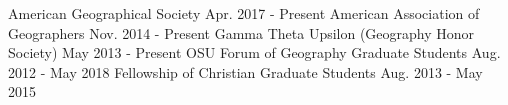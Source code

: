 \begin{cvmemberships}
  \cvmembership
    {\hspace{-3 em}}
    {American Geographical Society}
    {\hspace{-2 em} Apr. 2017 - Present}
    {} %
  \cvmembership
    {\hspace{-3 em}}
    {American Association of Geographers}
    {Nov. 2014 - Present}
    {} %
  \cvmembership
    {\hspace{-3 em}}
    {Gamma Theta Upsilon (Geography Honor Society)}
    {May 2013 - Present}
    {} %
  \cvmembership
    {\hspace{-3 em}}
    {OSU Forum of Geography Graduate Students}
    {Aug. 2012 - May 2018}
    {} %
  \cvmembership
    {\hspace{-3 em}}
    {Fellowship of Christian Graduate Students}
    {\hspace{-2 em} Aug. 2013 - May 2015}
    {} %
\end{cvmemberships}
